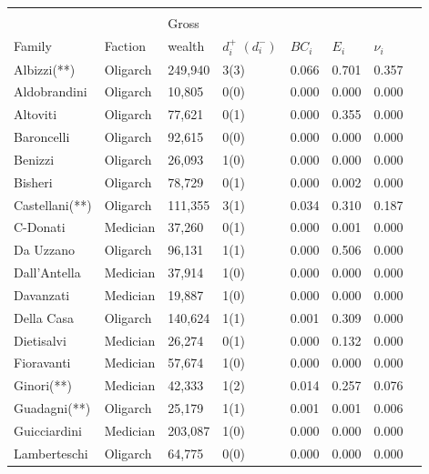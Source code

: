 \begin{subappendices}
\begin{table}
\begin{center}
\begin{tabu} to \textwidth {X[l]  X[c]  X[c]  X[c]  X[c]  X[c]	X[c]  X[c]}
\\[-1.8ex]\hline
\hline \\[-1.8ex]
       			&   		& Gross  &  &  &  & \\
Family 			& Faction	& wealth & $d^+_i$ $\left(d^-_i\right)$ & $BC_i$	&  $E_i$	&  $\nu_i$	\\ \hline
Albizzi(**)     & Oligarch	& 249,940 	& 3(3) & 0.066 & 0.701 & 0.357      \\
Aldobrandini    & Oligarch	& 10,805  	& 0(0) & 0.000 & 0.000 & 0.000      \\
Altoviti        & Oligarch	& 77,621  	& 0(1) & 0.000 & 0.355 & 0.000      \\
Baroncelli      & Oligarch	& 92,615  	& 0(0) & 0.000 & 0.000 & 0.000      \\
Benizzi         & Oligarch	& 26,093  	& 1(0) & 0.000 & 0.000 & 0.000      \\
Bisheri         & Oligarch	& 78,729  	& 0(1) & 0.000 & 0.002 & 0.000      \\
Castellani(**)  & Oligarch	& 111,355 	& 3(1) & 0.034 & 0.310 & 0.187      \\
C-Donati        & Medician	& 37,260  	& 0(1) & 0.000 & 0.001 & 0.000      \\
Da Uzzano       & Oligarch	& 96,131  	& 1(1) & 0.000 & 0.506 & 0.000      \\
Dall'Antella    & Medician	& 37,914  	& 1(0) & 0.000 & 0.000 & 0.000      \\
Davanzati       & Medician	& 19,887  	& 1(0) & 0.000 & 0.000 & 0.000      \\
Della Casa      & Oligarch	& 140,624 	& 1(1) & 0.001 & 0.309 & 0.000      \\
Dietisalvi      & Medician	& 26,274  	& 0(1) & 0.000 & 0.132 & 0.000      \\
Fioravanti      & Medician	& 57,674  	& 1(0) & 0.000 & 0.000 & 0.000      \\
Ginori(**)      & Medician	& 42,333  	& 1(2) & 0.014 & 0.257 & 0.076      \\
Guadagni(**)    & Oligarch	& 25,179  	& 1(1) & 0.001 & 0.001 & 0.006      \\
Guicciardini    & Medician	& 203,087 	& 1(0) & 0.000 & 0.000 & 0.000      \\
Lamberteschi    & Oligarch	& 64,775  	& 0(0) & 0.000 & 0.000 & 0.000      \\

\end{tabu}
\end{center}
\end{table}
\end{subappendices}
